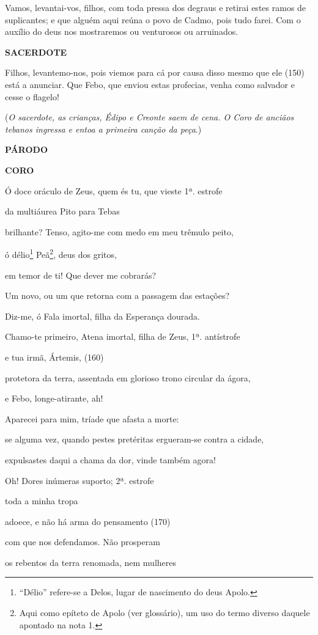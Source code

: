 Vamos, levantai-vos, filhos, com toda pressa dos degraus e retirai estes
ramos de suplicantes; e que alguém aqui reúna o povo de Cadmo, pois tudo
farei. Com o auxílio do deus nos mostraremos ou venturosos ou
arruinados.

\textbf{SACERDOTE }

Filhos, levantemo-nos, pois viemos para cá por causa disso mesmo que ele
(150) está a anunciar. Que Febo, que enviou estas profecias, venha como
salvador e cesse o flagelo!

(\emph{O sacerdote, as crianças, Édipo e Creonte saem de cena. O Coro de
anciãos tebanos ingressa e entoa a primeira canção da peça}.)

\textbf{PÁRODO}

\textbf{CORO}

Ó doce oráculo de Zeus, quem és tu, que vieste 1ª. estrofe

da multiáurea Pito para Tebas

brilhante? Tenso, agito-me com medo em meu trêmulo peito,

ó délio\footnote{``Délio'' refere-se a Delos, lugar de nascimento do
  deus Apolo.} Peã\footnote{Aqui como epíteto de Apolo (ver glossário),
  um uso do termo diverso daquele apontado na nota 1.}, deus dos gritos,

em temor de ti! Que dever me cobrarás?

Um novo, ou um que retorna com a passagem das estações?

Diz-me, ó Fala imortal, filha da Esperança dourada.

Chamo-te primeiro, Atena imortal, filha de Zeus, 1ª. antístrofe

e tua irmã, Ártemis, (160)

protetora da terra, assentada em glorioso trono circular da ágora,

e Febo, longe-atirante, ah!

Aparecei para mim, tríade que afasta a morte:

se alguma vez, quando pestes pretéritas ergueram-se contra a cidade,

expulsastes daqui a chama da dor, vinde também agora!

Oh! Dores inúmeras suporto; 2ª. estrofe

toda a minha tropa

adoece, e não há arma do pensamento (170)

com que nos defendamos. Não prosperam

os rebentos da terra renomada, nem mulheres

